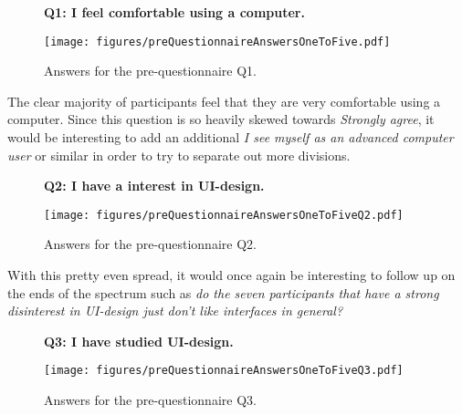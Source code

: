     \begin{figure}[h!]
      \textbf{Q1: I feel comfortable using a computer.}
      \begin{center}
        \texttt{[image: figures/preQuestionnaireAnswersOneToFive.pdf]}
        \vspace{-1cm}
        \caption{Answers for the pre-questionnaire Q1.}
      \end{center}
    \end{figure}

    The clear majority of participants feel that they are very comfortable
    using a computer. Since this question is so heavily skewed towards
    \textit{Strongly agree}, it would be interesting to add an additional
    \textit{I see myself as an advanced computer user} or similar in order
    to try to separate out more divisions.

    \begin{figure}[h!]
      \textbf{Q2: I have a interest in UI-design.}
      \begin{center}
        \texttt{[image: figures/preQuestionnaireAnswersOneToFiveQ2.pdf]}
        \vspace{-1cm}
        \caption{Answers for the pre-questionnaire Q2.}
      \end{center}
    \end{figure}

    With this pretty even spread, it would once again be interesting to follow
    up on the ends of the spectrum such as \textit{do the seven participants that
    have a strong disinterest in UI-design just don't like interfaces in
    general?}
%

    \begin{figure}[h!]
      \textbf{Q3: I have studied UI-design.}
      \begin{center}
        \texttt{[image: figures/preQuestionnaireAnswersOneToFiveQ3.pdf]}
        \vspace{-1cm}
        \caption{Answers for the pre-questionnaire Q3.}
      \end{center}
    \end{figure}

